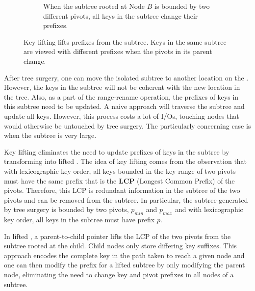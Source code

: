 \begin{figure}
\begin{subfigure}{\textwidth}
        \caption{\label{subfig:lift-2} When the subtree rooted at Node $B$ is
            bounded by two different pivots, all keys in the subtree change
            their prefixes.}
    \end{subfigure}
    \caption[An key lifting example]{\label{fig:lift}
        Key lifting lifts prefixes from the subtree. Keys in the same subtree
        are viewed with different prefixes when the pivots in its parent
        change.}
\end{figure}

After tree surgery, one can move the isolated subtree to another location on
the \bet.
However, the keys in the subtree will not be coherent with the new location in
the tree.
Also, as a part of the range-rename operation, the prefixes of keys in this
subtree need to be updated.
A naive approach will traverse the subtree and update all keys.
However, this process costs a lot of I/Os, touching nodes that would otherwise
be untouched by tree surgery.
The particularly concerning case is when the subtree is very large.

Key lifting eliminates the need to update prefixes of keys in the subtree by
transforming \bets into lifted \bets.
The idea of key lifting comes from the observation that with lexicographic key
order, all keys bounded in the key range of two pivots must have the same prefix
that is the \textbf{LCP} (Longest Common Prefix) of the pivots.
Therefore, this LCP is redundant information in the subtree of the two pivots
and can be removed from the subtree.
In particular, the subtree generated by tree surgery is bounded by two pivots,
$p_{min}$ and $p_{max}$ and with lexicographic key order, all keys in the
subtree must have prefix $p$.

In lifted \bets, a parent-to-child pointer lifts the LCP of the two pivots from
the subtree rooted at the child.
Child nodes only store differing key suffixes.
This approach encodes the complete key in the path taken to reach a given node
and one can then modify the prefix for a lifted subtree by only modifying the
parent node, eliminating the need to change key and pivot prefixes in all nodes
of a subtree.

